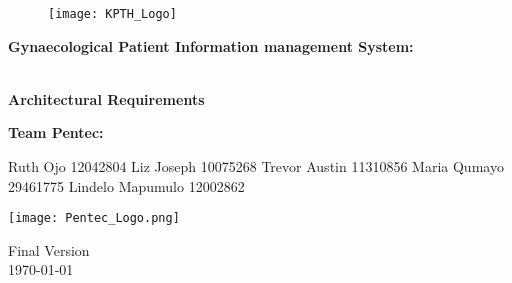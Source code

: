\begin{titlepage}
	\begin{center}
		
		\begin{figure}[t]
			\centering
			\texttt{[image: KPTH\_Logo]}
		\end{figure}		
		
		\textbf{\LARGE Gynaecological Patient Information
		management System:}
		
		\vspace{1 cm}
	    \textbf{\LARGE \\Architectural Requirements}
		
		\vspace{1 cm}
		\LARGE{\textbf{Team Pentec: }}
		

		\begin{flushright} \large
			
			Ruth Ojo 12042804\newline
			Liz Joseph 10075268\newline
			Trevor Austin 11310856\newline
			Maria Qumayo 29461775\newline
			Lindelo Mapumulo 12002862\newline
		\end{flushright}
		
				\vspace{1 cm}
				\centering
				\texttt{[image: Pentec\_Logo.png]}

		
		{\LARGE Final Version}
		\\
		{\large \today}		
		
		
	\end{center}
\end{titlepage}
